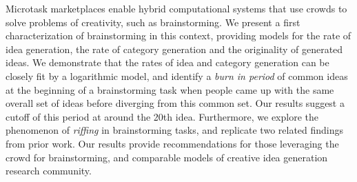 Microtask marketplaces enable hybrid computational systems that use crowds to solve problems of creativity, such as brainstorming. We present a first characterization of brainstorming in this context, providing models for the rate of idea generation, the rate of category generation and the originality of generated ideas. We demonstrate that the rates of idea and category generation can be closely fit by a logarithmic model, and identify a \emph{burn in period} of common ideas at the beginning of a brainstorming task when people came up with the same overall set of ideas before diverging from this common set. Our results suggest a cutoff of this period at around the 20th idea. Furthermore, we explore the phenomenon of \emph{riffing} in brainstorming tasks, and replicate two related findings from prior work. Our results provide recommendations for those leveraging the crowd for brainstorming, and comparable models of creative idea generation research community.


